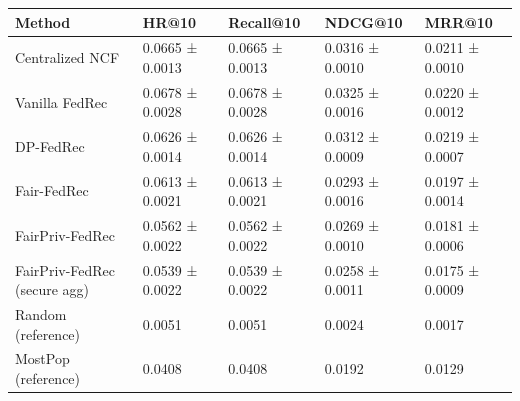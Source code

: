 \begin{tabular}{lllll}
\toprule
Method & HR@10 & Recall@10 & NDCG@10 & MRR@10 \\
\midrule
Centralized NCF & 0.0665 ± 0.0013 & 0.0665 ± 0.0013 & 0.0316 ± 0.0010 & 0.0211 ± 0.0010 \\
Vanilla FedRec & 0.0678 ± 0.0028 & 0.0678 ± 0.0028 & 0.0325 ± 0.0016 & 0.0220 ± 0.0012 \\
DP-FedRec & 0.0626 ± 0.0014 & 0.0626 ± 0.0014 & 0.0312 ± 0.0009 & 0.0219 ± 0.0007 \\
Fair-FedRec & 0.0613 ± 0.0021 & 0.0613 ± 0.0021 & 0.0293 ± 0.0016 & 0.0197 ± 0.0014 \\
FairPriv-FedRec & 0.0562 ± 0.0022 & 0.0562 ± 0.0022 & 0.0269 ± 0.0010 & 0.0181 ± 0.0006 \\
FairPriv-FedRec (secure agg) & 0.0539 ± 0.0022 & 0.0539 ± 0.0022 & 0.0258 ± 0.0011 & 0.0175 ± 0.0009 \\
Random (reference) & 0.0051 & 0.0051 & 0.0024 & 0.0017 \\
MostPop (reference) & 0.0408 & 0.0408 & 0.0192 & 0.0129 \\
\bottomrule
\end{tabular}
